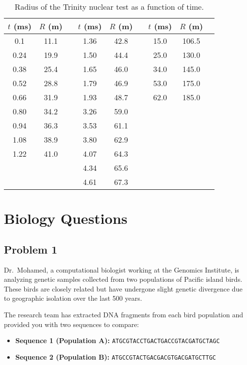 \documentclass[12pt]{article}
\begin{document}
\begin{table}[htbp]
\centering
\caption{Radius of the Trinity nuclear test as a function of time.}
\label{tab:trinity}
\begin{tabular}{ccc|ccc|ccc}
\toprule
$t$ (ms) & $R$ (m) & & $t$ (ms) & $R$ (m) & & $t$ (ms) & $R$ (m) \\
\midrule
0.1  & 11.1 & & 1.36 & 42.8 & & 15.0 & 106.5 \\
0.24 & 19.9 & & 1.50 & 44.4 & & 25.0 & 130.0 \\
0.38 & 25.4 & & 1.65 & 46.0 & & 34.0 & 145.0 \\
0.52 & 28.8 & & 1.79 & 46.9 & & 53.0 & 175.0 \\
0.66 & 31.9 & & 1.93 & 48.7 & & 62.0 & 185.0 \\
0.80 & 34.2 & & 3.26 & 59.0 & &      &       \\
0.94 & 36.3 & & 3.53 & 61.1 & &      &       \\
1.08 & 38.9 & & 3.80 & 62.9 & &      &       \\
1.22 & 41.0 & & 4.07 & 64.3 & &      &       \\
     &      & & 4.34 & 65.6 & &      &       \\
     &      & & 4.61 & 67.3 & &      &       \\
\bottomrule
\end{tabular}
\end{table}

\newpage
\section{Biology Questions}
\subsection{Problem 1}
Dr.~Mohamed, a computational biologist working at the Genomics Institute, is analyzing genetic samples collected from two populations of Pacific island birds. These birds are closely related but have undergone slight genetic divergence due to geographic isolation over the last 500 years.

The research team has extracted DNA fragments from each bird population and provided you with two sequences to compare:

\begin{itemize}[leftmargin=2cm]
    \item \textbf{Sequence 1 (Population A):} \texttt{ATGCGTACCTGACTGACCGTACGATGCTAGC}
    \item \textbf{Sequence 2 (Population B):} \texttt{ATGCCGTACTGACGACGTGACGATGCTTGC}
\end{itemize}
\end{document}
